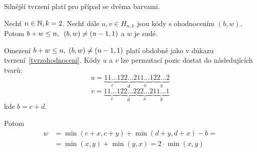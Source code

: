 Silnější tvrzení platí pro případ se dvěma barvami. 

\begin{tvrz}\label{tvrzohodnoceni2}
    Nechť $n \in \mathbb{N}, k=2$. Nechť dále $u, v \in H_{n,k}$ jsou kódy s ohodnocením $(b,w)$. Potom $b + w \leq n, \hspace{5px} (b,w) \neq (n-1,1)$ a $w$ je sudé.
\end{tvrz}
\begin{dukaz}
Omezení $b + w \leq n, \hspace{3px} (b,w) \neq (n-1,1)$ platí obdobně jako v důkazu tvrzení~\ref{tvrzohodnoceni}. Kódy $u$ a $v$ lze permutací pozic dostat do následujících tvarů:
    \[
  u = 
    \underbrace{11\dots1}_{c}
    \underbrace{22\dots2}_{d}
    \underbrace{11\dots1}_{x}
    \underbrace{22\dots2}_{y}
 \]
 \[
  v = 
    \underbrace{11\dots1}_{c}
    \underbrace{22\dots2}_{d}
    \underbrace{22\dots2}_{x}
    \underbrace{11\dots1}_{y}
 \]
 kde $b = c + d$. 

 Potom
 \begin{align*}
     w &= \min(c + x, c + y) + \min(d + y, d + x) - b =\\
     &= \min(x, y) + \min(y, x) = 2\cdot \min(x, y)
 \end{align*}
\end{dukaz}

    





